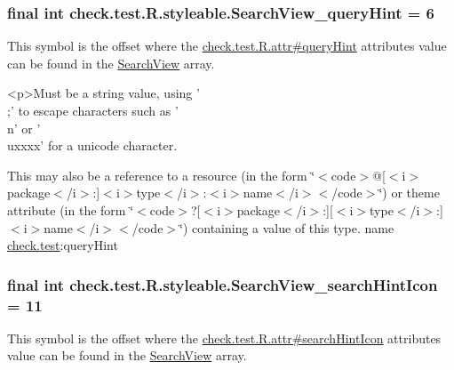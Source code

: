 \subsubsection[{Search\+View\+\_\+query\+Hint}]{\setlength{\rightskip}{0pt plus 5cm}final int check.\+test.\+R.\+styleable.\+Search\+View\+\_\+query\+Hint = 6\hspace{0.3cm}{\ttfamily [static]}}\label{classcheck_1_1test_1_1_r_1_1styleable_a81a033a05b9ad3bb82d2aa9daa757cfb}
This symbol is the offset where the \hyperlink{classcheck_1_1test_1_1_r_1_1attr_a6be50aa8a3f5405bbcce9d6d866f3b97}{check.\+test.\+R.\+attr\#query\+Hint} attribute\textquotesingle{}s value can be found in the \hyperlink{classcheck_1_1test_1_1_r_1_1styleable_af133609668e9a4263b21387e9a7574f8}{Search\+View} array.

\begin{DoxyVerb}      <p>Must be a string value, using '\\;' to escape characters such as '\\n' or '\\uxxxx' for a unicode character.
\end{DoxyVerb}
 

This may also be a reference to a resource (in the form \char`\"{}$<$code$>$@\mbox{[}$<$i$>$package$<$/i$>$\+:\mbox{]}$<$i$>$type$<$/i$>$\+:$<$i$>$name$<$/i$>$$<$/code$>$\char`\"{}) or theme attribute (in the form \char`\"{}$<$code$>$?\mbox{[}$<$i$>$package$<$/i$>$\+:\mbox{]}\mbox{[}$<$i$>$type$<$/i$>$\+:\mbox{]}$<$i$>$name$<$/i$>$$<$/code$>$\char`\"{}) containing a value of this type.  name \hyperlink{namespacecheck_1_1test}{check.\+test}\+:query\+Hint \hypertarget{classcheck_1_1test_1_1_r_1_1styleable_ad0538833b27a29b6c19c419c1e948765}{}
\subsubsection[{Search\+View\+\_\+search\+Hint\+Icon}]{\setlength{\rightskip}{0pt plus 5cm}final int check.\+test.\+R.\+styleable.\+Search\+View\+\_\+search\+Hint\+Icon = 11\hspace{0.3cm}{\ttfamily [static]}}\label{classcheck_1_1test_1_1_r_1_1styleable_ad0538833b27a29b6c19c419c1e948765}
This symbol is the offset where the \hyperlink{classcheck_1_1test_1_1_r_1_1attr_aed7f407928079e9b1f426217289de596}{check.\+test.\+R.\+attr\#search\+Hint\+Icon} attribute\textquotesingle{}s value can be found in the \hyperlink{classcheck_1_1test_1_1_r_1_1styleable_af133609668e9a4263b21387e9a7574f8}{Search\+View} array.

